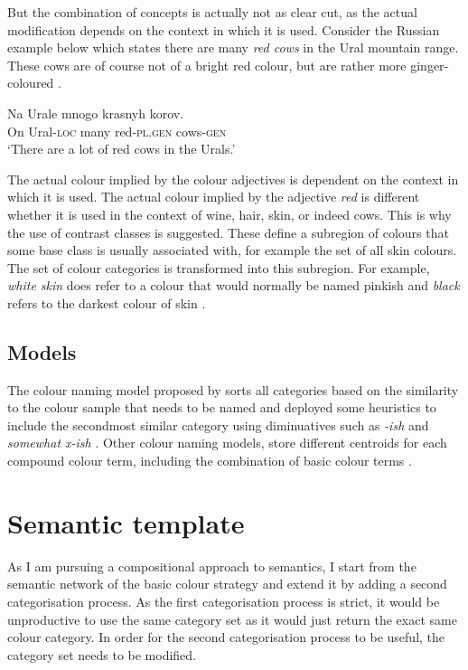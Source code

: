 But the combination of concepts is actually not as clear cut, as the
actual modification depends on the context in which it is
used. Consider the Russian example below which states there are many
\textit{red cows} in the Ural mountain range. These cows are of course not
of a bright red colour, but are rather more ginger-coloured
\citep{tribushinina08cognitive}.

\ea
\gll Na Urale mnogo krasnyh korov.\\
On Ural-\textsc{loc} many red-\textsc{pl.gen} cows-\textsc{gen}\\
\glt `There are a lot of red cows in the Urals.'\\
\z


The actual colour implied by the colour adjectives is dependent on
the context in which it is used. The actual colour implied by the
adjective \textit{red} is different whether it is used in the context of
wine, hair, skin, or indeed cows. This is why the use of contrast
classes is suggested. These define a subregion of colours that some
base class is usually associated with, for example the set of all skin
colours. The set of colour categories is transformed into this
subregion. For example, \textit{white skin} does refer to a colour that
would normally be named pinkish and \textit{black} refers to the darkest
colour of skin \citep{gardenfors04conceptual}.

\subsection{Models}

The colour naming model proposed by
\citeauthor{lammens94computational} sorts all categories based on the
similarity to the colour sample that needs to be named and deployed
some heuristics to include the secondmost similar category using
diminuatives such as \textit{-ish} and \textit{somewhat x-ish}
\citep{lammens94computational}. Other colour naming models, store
different centroids for each compound colour term, including the
combination of basic colour terms \citep{mojsilovic05computational}.

\section{Semantic template}
\label{s:ccs-semantic-template}

As I am pursuing a compositional approach to semantics, I start from
the semantic network of the basic colour strategy and extend it by
adding a second categorisation process. As the first categorisation
process is strict, it would be unproductive to use the same category
set as it would just return the exact same colour category. In order
for the second categorisation process to be useful, the category set
needs to be modified.

